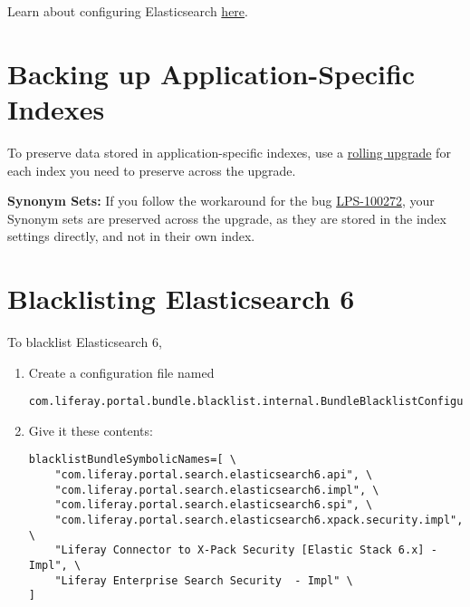 \noindent\hrulefill

Learn about configuring Elasticsearch
\href{/docs/7-2/deploy/-/knowledge_base/d/configuring-the-liferay-elasticsearch-connector}{here}.

\section{Backing up Application-Specific
Indexes}\label{backing-up-application-specific-indexes}

To preserve data stored in application-specific indexes, use a
\href{https://www.elastic.co/guide/en/elasticsearch/reference/7.x/rolling-upgrades.html}{rolling
upgrade} for each index you need to preserve across the upgrade.

\noindent\hrulefill

\textbf{Synonym Sets:} If you follow the workaround for the bug
\href{https://issues.liferay.com/browse/LPS-100272}{LPS-100272}, your
Synonym sets are preserved across the upgrade, as they are stored in the
index settings directly, and not in their own index.

\noindent\hrulefill

\section{Blacklisting Elasticsearch
6}\label{blacklisting-elasticsearch-6}

To blacklist Elasticsearch 6,

\begin{enumerate}
\def\labelenumi{\arabic{enumi}.}
\item
  Create a configuration file named

\begin{verbatim}
com.liferay.portal.bundle.blacklist.internal.BundleBlacklistConfiguration.config
\end{verbatim}
\item
  Give it these contents:

\begin{verbatim}
blacklistBundleSymbolicNames=[ \
    "com.liferay.portal.search.elasticsearch6.api", \
    "com.liferay.portal.search.elasticsearch6.impl", \
    "com.liferay.portal.search.elasticsearch6.spi", \
    "com.liferay.portal.search.elasticsearch6.xpack.security.impl", \
    "Liferay Connector to X-Pack Security [Elastic Stack 6.x] - Impl", \
    "Liferay Enterprise Search Security  - Impl" \
]
\end{verbatim}
\end{enumerate}

